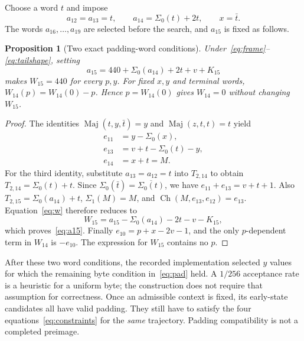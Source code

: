 \documentclass[11pt,a4paper]{article}
\newtheorem{proposition}{Proposition}
\newcommand{\Ch}{\operatorname{Ch}}
\newcommand{\Maj}{\operatorname{Maj}}
\begin{document}
Choose a word $t$ and impose
\begin{equation}
a_{12}=a_{13}=t,\qquad a_{14}=\Sigma_0(t)+2t,\qquad x=\bar t.\label{eq:tailshape}
\end{equation}
The words $a_{16},\ldots,a_{19}$ are selected before the search, and $a_{15}$ is fixed as follows.

\begin{proposition}[Two exact padding-word conditions]
Under~\eqref{eq:frame}--\eqref{eq:tailshape}, setting
\begin{equation}
a_{15}=440+\Sigma_0(a_{14})+2t+v+K_{15}\label{eq:a15}
\end{equation}
makes $W_{15}=440$ for every $p,y$. For fixed $x,y$ and terminal words, $W_{14}(p)=W_{14}(0)-p$. Hence $p=W_{14}(0)$ gives $W_{14}=0$ without changing $W_{15}$.
\end{proposition}
\begin{proof}
The identities $\Maj(t,y,\bar t)=y$ and $\Maj(z,t,t)=t$ yield
\begin{align*}
e_{11}&=y-\Sigma_0(x),\\
e_{13}&=v+t-\Sigma_0(t)-y,\\
e_{14}&=x+t=M.
\end{align*}
For the third identity, substitute $a_{13}=a_{12}=t$ into $T_{2,14}$ to obtain $T_{2,14}=\Sigma_0(t)+t$.
Since $\Sigma_0(\bar t)=\overline{\Sigma_0(t)}$, we have $e_{11}+e_{13}=v+t+1$. Also $T_{2,15}=\Sigma_0(a_{14})+t$, $\Sigma_1(M)=M$, and $\Ch(M,e_{13},e_{12})=e_{13}$. Equation~\eqref{eq:w} therefore reduces to
\[
W_{15}=a_{15}-\Sigma_0(a_{14})-2t-v-K_{15},
\]
which proves~\eqref{eq:a15}. Finally $e_{10}=p+x-2v-1$, and the only $p$-dependent term in $W_{14}$ is $-e_{10}$. The expression for $W_{15}$ contains no $p$.
\end{proof}

After these two word conditions, the recorded implementation selected $y$ values for which the remaining byte condition in~\eqref{eq:pad} held. A $1/256$ acceptance rate is a heuristic for a uniform byte; the construction does not require that assumption for correctness. Once an admissible context is fixed, its early-state candidates all have valid padding. They still have to satisfy the four equations~\eqref{eq:constraints} for the \emph{same} trajectory. Padding compatibility is not a completed preimage.
\end{document}
